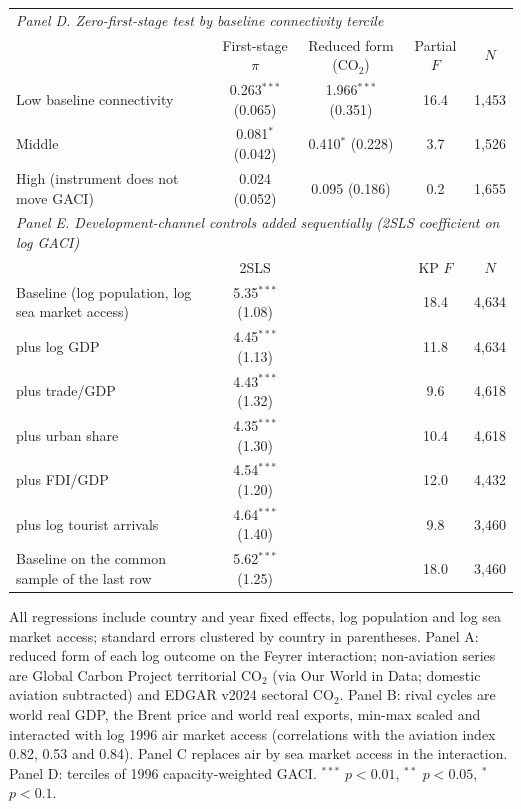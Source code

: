 \documentclass[12pt]{extarticle}
\begin{document}
\begin{table}[H]
{\begin{threeparttable}
\begin{tabular}{lcccc}
\midrule
\multicolumn{5}{l}{\textit{Panel D. Zero-first-stage test by baseline connectivity tercile}} \\
 & First-stage $\pi$ & Reduced form (CO$_2$) & Partial $F$ & $N$ \\
  Low baseline connectivity & 0.263$^{***}$ (0.065) & 1.966$^{***}$ (0.351) & 16.4 & 1,453 \\
  Middle & 0.081$^{*}$ (0.042) & 0.410$^{*}$ (0.228) & 3.7 & 1,526 \\
  High (instrument does not move GACI) & 0.024 (0.052) & 0.095 (0.186) & 0.2 & 1,655 \\
\midrule
\multicolumn{5}{l}{\textit{Panel E. Development-channel controls added sequentially (2SLS coefficient on log GACI)}} \\
 & 2SLS & & KP $F$ & $N$ \\
  Baseline (log population, log sea market access) & 5.35$^{***}$ (1.08) & & 18.4 & 4,634 \\
  \quad plus log GDP & 4.45$^{***}$ (1.13) & & 11.8 & 4,634 \\
  \quad plus trade/GDP & 4.43$^{***}$ (1.32) & & 9.6 & 4,618 \\
  \quad plus urban share & 4.35$^{***}$ (1.30) & & 10.4 & 4,618 \\
  \quad plus FDI/GDP & 4.54$^{***}$ (1.20) & & 12.0 & 4,432 \\
  \quad plus log tourist arrivals & 4.64$^{***}$ (1.40) & & 9.8 & 3,460 \\
  Baseline on the common sample of the last row & 5.62$^{***}$ (1.25) & & 18.0 & 3,460 \\
\bottomrule
\end{tabular}
\begin{tablenotes}\scriptsize
\item All regressions include country and year fixed effects, log population and log sea market access; standard errors clustered by country in parentheses. Panel A: reduced form of each log outcome on the Feyrer interaction; non-aviation series are Global Carbon Project territorial CO$_2$ (via Our World in Data; domestic aviation subtracted) and EDGAR v2024 sectoral CO$_2$. Panel B: rival cycles are world real GDP, the Brent price and world real exports, min-max scaled and interacted with log 1996 air market access (correlations with the aviation index 0.82, 0.53 and 0.84). Panel C replaces air by sea market access in the interaction. Panel D: terciles of 1996 capacity-weighted GACI. $^{***}$ $p<0.01$, $^{**}$ $p<0.05$, $^{*}$ $p<0.1$.
\end{tablenotes}
\end{threeparttable}}
\end{table}
\end{document}
